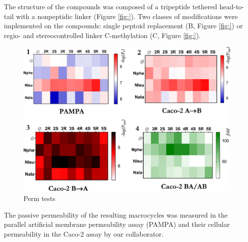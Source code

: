 The structure of the compounds was composed of a tripeptide tethered head-to-tail with a nonpeptidic linker (Figure \ref{fig:}). 
Two classes of modifications were implemented on the compounds: single peptoid replacement (B, Figure \ref{fig:}) or regio- and stereocontrolled linker C-methylation (C, Figure \ref{fig:}). 
%

\begin{figure}
    \centering
    \includegraphics[width=\textwidth]{7_chapter_5/fig/intro/pampa.jpeg}
    \caption{Perm tests}
    \label{fig:permAssays}
\end{figure}

The passive permeability of the resulting macrocycles was measured in the parallel artificial membrane permeability assay (PAMPA) and their cellular permeability in the Caco-2 assay by our collaborator.\cite{Di2015}

